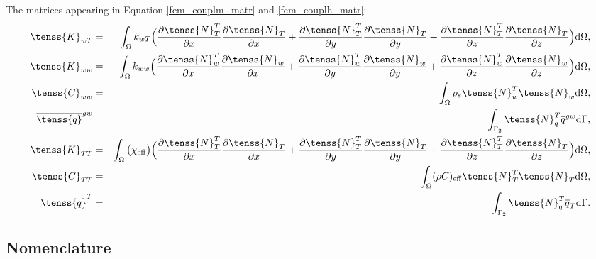 The matrices appearing in Equation \eqref{fem_couplm_matr} and \eqref{fem_couplh_matr}:
\begin{eqnarray}
\tenss{K}_{wT} &=& \int_{\Omega} k_{wT} \Big(\frac{\partial \tenss{N}_{T}^T}{\partial x}
\frac{\partial \tenss{N}_{T}}{\partial x} 
+ \frac{\partial \tenss{N}_{T}^T}{\partial y}\frac{\partial \tenss{N}_{T}}{\partial y} + 
\frac{\partial \tenss{N}_{T}^T}{\partial z}\frac{\partial \tenss{N}_{T}}{\partial z}\Big){\rm d}\Omega,\\
\tenss{K}_{ww} &=& \int_{\Omega} k_{ww} \Big(\frac{\partial \tenss{N}_w^T}{\partial x}
\frac{\partial \tenss{N}_w}{\partial x} 
+ \frac{\partial \tenss{N}_w^T}{\partial y}\frac{\partial \tenss{N}_w}{\partial y} + 
\frac{\partial \tenss{N}_w^T}{\partial z}\frac{\partial \tenss{N}_w}{\partial z}\Big){\rm d}\Omega,\\
\tenss{C}_{ww} &=& \int_{\Omega} \rho_s \tenss{N}_w^T \tenss{N}_w {\rm d}\Omega,\\
\overline{\tenss{q}}^{gw} &=& \int_{\Gamma_2} \tenss{N}_q^T  \overline{q}^{gw}{\rm d}\Gamma,\\
\tenss{K}_{TT} &=& \int_{\Omega} \big(\chi_{\rm eff}\big) \Big(\frac{\partial \tenss{N}_{T}^T}{\partial x}
\frac{\partial \tenss{N}_{T}}{\partial x} 
+ \frac{\partial \tenss{N}_{T}^T}{\partial y}\frac{\partial \tenss{N}_{T}}{\partial y} + 
\frac{\partial \tenss{N}_{T}^T}{\partial z}\frac{\partial \tenss{N}_{T}}{\partial z}\Big){\rm d}\Omega,\\
\tenss{C}_{TT} &=& \int_{\Omega} (\rho C)_{\rm eff} \tenss{N}_{T}^T \tenss{N}_{T} {\rm d}\Omega,\\
\overline{\tenss{q}}^{T} &=& \int_{\Gamma_2} \tenss{N}_q^T  \overline{q}_{T}{\rm d}\Gamma.
\end{eqnarray}

\newpage
\subsection{Nomenclature}

